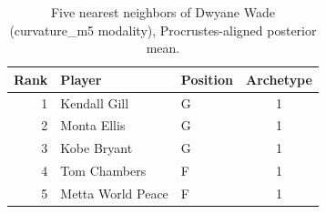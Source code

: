 \begin{table}[htbp]
  \centering\small
  \begin{tabular}{rllc}
    \toprule
    Rank & Player & Position & Archetype \\
    \midrule
    1 & Kendall Gill & G & 1 \\
    2 & Monta Ellis & G & 1 \\
    3 & Kobe Bryant & G & 1 \\
    4 & Tom Chambers & F & 1 \\
    5 & Metta World Peace & F & 1 \\
    \bottomrule
  \end{tabular}
  \caption{Five nearest neighbors of Dwyane Wade (curvature_m5 modality), Procrustes-aligned posterior mean.}
  \label{tab:Dwyane_Wade_neighbors_curvature_m5}
\end{table}

